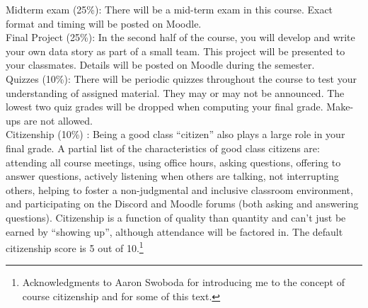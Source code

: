 \documentclass[10pt]{article}
\begin{document}
\noindent Midterm exam (25\%): There will be a mid-term exam in this course. Exact format and timing will be posted on Moodle. \\

\noindent Final Project (25\%): In the second half of the course, you will develop and write your own data story as part of a small team. This project will be presented to your classmates. Details will be posted on Moodle during the semester. \\

\noindent Quizzes (10\%): There will be periodic quizzes throughout the course to test your understanding of assigned material. They may or may not be announced. The lowest two quiz grades will be dropped when computing your final grade. Make-ups are not allowed.\\

\noindent Citizenship (10\%) : Being a good class ``citizen'' also plays a large role in your final grade. A partial list of the characteristics of good class citizens are: attending all course meetings, using office hours, asking questions, offering to answer questions, actively listening when others are talking, not interrupting others, helping to foster a non-judgmental and inclusive classroom environment, and participating on the Discord and Moodle forums (both asking and answering questions). Citizenship is a function of quality than quantity and can't just be earned by ``showing up'', although attendance will be factored in. The default citizenship score is 5 out of 10.\footnote{Acknowledgments to Aaron Swoboda for introducing me to the concept of course citizenship and for some of this text.} \\
\end{document}

